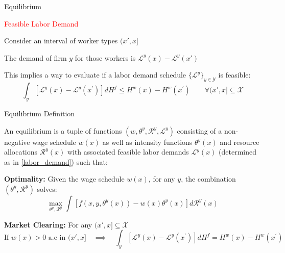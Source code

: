 \documentclass[notes,11pt, aspectratio=169]{beamer}
\newenvironment{wideitemize}{\itemize\addtolength{\itemsep}{10pt}}{\enditemize}
\begin{document}
\begin{frame}{Equilibrium}
	\begin{wideitemize}
		\item \textcolor{red}{Feasible Labor Demand}
		\begin{wideitemize}
			\item Consider an interval of worker types $(x',x]$
			\item The demand of firm $y$ for those workers is $\mathcal{L}^y(x) - \mathcal{L}^y(x')$
			\pause
			\item This implies a way to evaluate if a labor demand schedule $\{\mathcal{L}^y\}_{y\in \mathcal{Y}}$ is feasible:\[\int_{y}\left[\mathcal{L}^{y}(x)-\mathcal{L}^{y}\left(x^{\prime}\right)\right] d H^{f} \leq H^{w}(x)-H^{w}\left(x^{\prime}\right) \qquad \forall  (x',x]\subseteq\mathcal{X}\]
		\end{wideitemize}
	\end{wideitemize}
\end{frame}

\begin{frame}{Equilibrium Definition}
	\begin{wideitemize}
		\item An equilibrium is a tuple of functions $\left(w, \theta^{y}, \mathcal{R}^{y}, \mathcal{L}^{y}\right)$ consisting of a non-negative wage schedule $w(x)$ as well as intensity functions $\theta^{y}(x)$ and resource allocations $\mathcal{R}^{y}(x)$ with associated feasible labor demands $\mathcal{L}^{y}(x)$ (determined as in \eqref{labor_demand}) such that:
		\pause
		\begin{wideitemize}
			\item \textbf{Optimality:} Given the wage schedule $w(x)$, for any $y$, the combination $\left(\theta^{y}, \mathcal{R}^{y}\right)$ solves:$$\max _{\theta^y, \mathcal{R}^{y}} \int\left[f\left(x, y, \theta^{y}(x)\right)-w(x) \theta^{y}(x)\right] d \mathcal{R}^{y}(x)$$
			\pause
			\item \textbf{Market Clearing:} For any $(x',x]\subseteq\mathcal{X}$
			\[\text{If } w(x)>0 \text{ a.e in } (x', x]  \quad \implies \quad   \int_{y}\left[\mathcal{L}^{y}(x)-\mathcal{L}^{y}\left(x^{\prime}\right)\right] d H^{f} = H^{w}(x)-H^{w}\left(x^{\prime}\right) \]
		\end{wideitemize}
	\end{wideitemize}
\end{frame}
\end{document}
